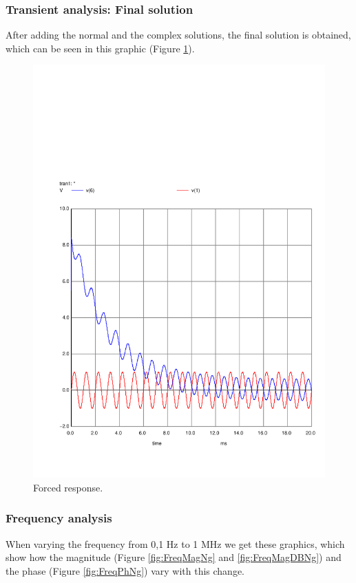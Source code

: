 \subsubsection{Transient analysis: Final solution}

\indent

After adding the normal and the complex solutions, the final solution is obtained, which can be seen in this graphic (Figure \ref{fig:ForNg}).

\begin{figure}[H] \centering
    \includegraphics[width=0.6\linewidth, trim={2cm 1.5cm 0.5cm 6cm}, clip]{../Simulation/trans_forc.pdf}
    \caption{Forced response.}
    \label{fig:ForNg}
\end{figure}




\subsubsection{Frequency analysis}

\indent

When varying the frequency from 0,1 Hz to 1 MHz we get these graphics, which show how the magnitude (Figure \ref{fig:FreqMagNg} and \ref{fig:FreqMagDBNg}) and the phase (Figure \ref{fig:FreqPhNg}) vary with this change.

